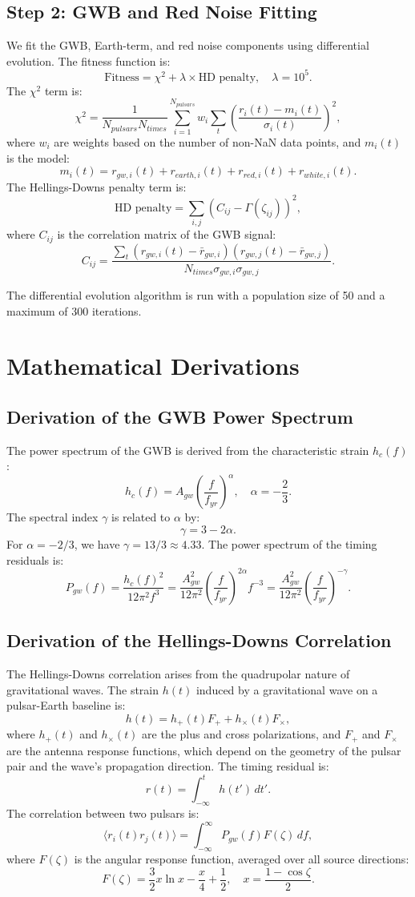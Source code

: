 \documentclass[11pt]{article}
\begin{document}
\subsection{Step 2: GWB and Red Noise Fitting}
We fit the GWB, Earth-term, and red noise components using differential evolution. The fitness function is:
\[
\text{Fitness} = \chi^2 + \lambda \times \text{HD penalty}, \quad \lambda = 10^5.
\]
The $\chi^2$ term is:
\[
\chi^2 = \frac{1}{N_{pulsars} N_{times}} \sum_{i=1}^{N_{pulsars}} w_i \sum_{t} \left( \frac{r_i(t) - m_i(t)}{\sigma_i(t)} \right)^2,
\]
where $w_i$ are weights based on the number of non-NaN data points, and $m_i(t)$ is the model:
\[
m_i(t) = r_{gw,i}(t) + r_{earth,i}(t) + r_{red,i}(t) + r_{white,i}(t).
\]
The Hellings-Downs penalty term is:
\[
\text{HD penalty} = \sum_{i,j} \left( C_{ij} - \Gamma(\zeta_{ij}) \right)^2,
\]
where $C_{ij}$ is the correlation matrix of the GWB signal:
\[
C_{ij} = \frac{\sum_t \left( r_{gw,i}(t) - \bar{r}_{gw,i} \right) \left( r_{gw,j}(t) - \bar{r}_{gw,j} \right)}{N_{times} \sigma_{gw,i} \sigma_{gw,j}}.
\]

The differential evolution algorithm is run with a population size of 50 and a maximum of 300 iterations.

\section{Mathematical Derivations}

\subsection{Derivation of the GWB Power Spectrum}
The power spectrum of the GWB is derived from the characteristic strain $h_c(f)$:
\[
h_c(f) = A_{gw} \left( \frac{f}{f_{yr}} \right)^{\alpha}, \quad \alpha = -\frac{2}{3}.
\]
The spectral index $\gamma$ is related to $\alpha$ by:
\[
\gamma = 3 - 2\alpha.
\]
For $\alpha = -2/3$, we have $\gamma = 13/3 \approx 4.33$. The power spectrum of the timing residuals is:
\[
P_{gw}(f) = \frac{h_c(f)^2}{12 \pi^2 f^3} = \frac{A_{gw}^2}{12 \pi^2} \left( \frac{f}{f_{yr}} \right)^{2\alpha} f^{-3} = \frac{A_{gw}^2}{12 \pi^2} \left( \frac{f}{f_{yr}} \right)^{-\gamma}.
\]

\subsection{Derivation of the Hellings-Downs Correlation}
The Hellings-Downs correlation arises from the quadrupolar nature of gravitational waves. The strain $h(t)$ induced by a gravitational wave on a pulsar-Earth baseline is:
\[
h(t) = h_+(t) F_+ + h_\times(t) F_\times,
\]
where $h_+(t)$ and $h_\times(t)$ are the plus and cross polarizations, and $F_+$ and $F_\times$ are the antenna response functions, which depend on the geometry of the pulsar pair and the wave’s propagation direction. The timing residual is:
\[
r(t) = \int_{-\infty}^{t} h(t') \, dt'.
\]
The correlation between two pulsars is:
\[
\langle r_i(t) r_j(t) \rangle = \int_{-\infty}^{\infty} P_{gw}(f) F(\zeta) \, df,
\]
where $F(\zeta)$ is the angular response function, averaged over all source directions:
\[
F(\zeta) = \frac{3}{2} x \ln x - \frac{x}{4} + \frac{1}{2}, \quad x = \frac{1 - \cos \zeta}{2}.
\]
\end{document}
